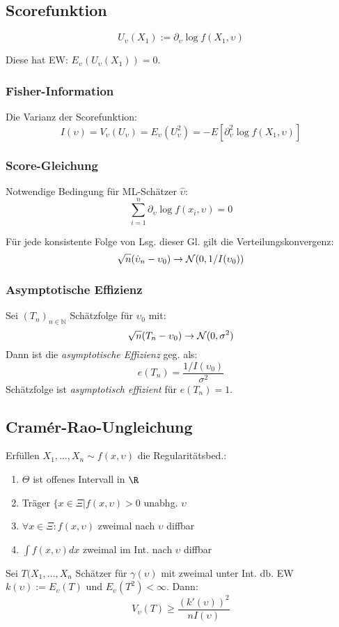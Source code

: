 \subsection*{Scorefunktion}

\[U_\upsilon(X_1) := \partial_\upsilon \log f(X_1,\upsilon) \]

Diese hat EW: \(E_\upsilon(U_\upsilon(X_1)) = 0\).

\subsubsection*{Fisher-Information}

Die Varianz der Scorefunktion:
\[ I(\upsilon) = V_\upsilon(U_\upsilon) = E_\upsilon(U_\upsilon^2) = -E\left[ \partial_\upsilon^2 \log f(X_1,\upsilon) \right]\]

\subsubsection*{Score-Gleichung}

Notwendige Bedingung für ML-Schätzer \(\hat\upsilon\):
\[\sum_{i=1}^n \partial_\upsilon \log f(x_i,\upsilon) = 0 \]

Für jede konsistente Folge von Lsg. dieser Gl. gilt die Verteilungskonvergenz:
\[ \sqrt{n}(\hat\upsilon_n - \upsilon_0) \to \mathcal{N}(0, 1/I(\upsilon_0)) \]

\subsubsection*{Asymptotische Effizienz}

Sei \((T_n)_{n \in \mathbb{N}}\) Schätzfolge für \(\upsilon_0\) mit:
\[\sqrt{n}(T_n - \upsilon_0) \to \mathcal{N}(0,\sigma^2) \]
Dann ist die \emph{asymptotische Effizienz} geg. als:
\[ e(T_n) = \frac{1/I(\upsilon_0)}{\sigma^2} \]
Schätzfolge ist \emph{asymptotisch effizient} für \(e(T_n)=1\).

\subsection*{Cram\'er-Rao-Ungleichung}

Erfüllen \(X_1,\dots,X_n \sim f(x,\upsilon)\) die Regularitätsbed.:
\begin{enumerate}
	\item \(\Theta\) ist offenes Intervall in \(\R\)
	\item Träger \(\{x \in \Xi | f(x,\upsilon) > 0\) unabhg. \(\upsilon\)
	\item \(\forall x \in \Xi : f(x,\upsilon)\) zweimal nach \(\upsilon\) diffbar
	\item \(\int f(x,\upsilon) dx\) zweimal im Int. nach \(\upsilon\) diffbar
\end{enumerate}
Sei \(T(X_1,\dots,X_n\) Schätzer für \(\gamma(\upsilon)\) mit zweimal unter Int. db. EW \(k(\upsilon) := E_\upsilon(T)\) und \(E_\upsilon(T^2) < \infty\). Dann:
\[ V_\upsilon(T) \geq \frac{(k'(\upsilon))^2}{nI(\upsilon)} \]

